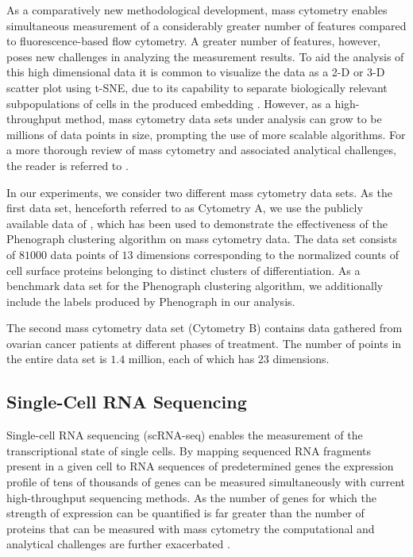 As a comparatively new methodological development, mass cytometry enables simultaneous measurement of a considerably greater number of features compared to fluorescence-based flow cytometry. A greater number of features, however, poses new challenges in analyzing the measurement results. To aid the analysis of this high dimensional data it is common to visualize the data as a 2-D or 3-D scatter plot using t-SNE, due to its capability to separate biologically relevant subpopulations of cells in the produced embedding \cite{visne}. However, as a high-throughput method, mass cytometry data sets under analysis can grow to be millions of data points in size, prompting the use of more scalable algorithms. For a more thorough review of mass cytometry and associated analytical challenges, the reader is referred to \cite{mass_cytometry}.

In our experiments, we consider two different mass cytometry data sets. As the first data set, henceforth referred to as Cytometry A, we use the publicly available data of \cite{phenograph}, which has been used to demonstrate the effectiveness of the Phenograph clustering algorithm on mass cytometry data. The data set consists of $81000$ data points of $13$ dimensions corresponding to the normalized counts of cell surface proteins belonging to distinct clusters of differentiation. As a benchmark data set for the Phenograph clustering algorithm, we additionally include the labels produced by Phenograph in our analysis.

The second mass cytometry data set (Cytometry B) contains data gathered from ovarian cancer patients at different phases of treatment. The number of points in the entire data set is $1.4$ million, each of which has $23$ dimensions.

\subsection{Single-Cell RNA Sequencing}

Single-cell RNA sequencing (scRNA-seq) enables the measurement of the transcriptional state of single cells. By mapping sequenced RNA fragments present in a given cell to RNA sequences of predetermined genes the expression profile of tens of thousands of genes can be measured simultaneously with current high-throughput sequencing methods. As the number of genes for which the strength of expression can be quantified is far greater than the number of proteins that can be measured with mass cytometry the computational and analytical challenges are further exacerbated \cite{high_dimensional_data_spaces_gene_and_protein, computational_challenges_single_cell_transcriptomics}.

